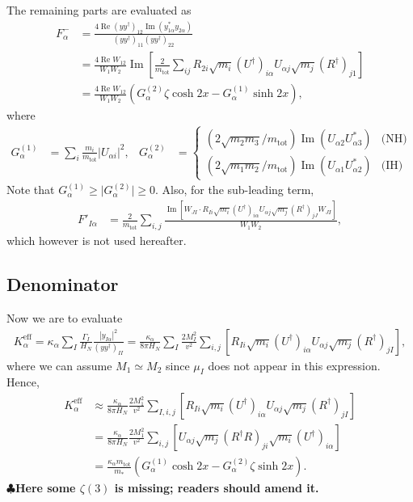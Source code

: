 \documentclass[a4paper,11pt,captions=tableheading,DIV=12]{scrartcl}
\numberwithin{equation}{section}
\newcommand\abs[1]{\lvert#1\rvert}
\newcommand\Abs[1]{\left\lvert#1\right\rvert}
\newcommand{\TODO}[1]{{\textbf{\color{red}$\clubsuit$#1}}}
\renewcommand{\Re}{\mathop{\mathrm{Re}}}
\renewcommand{\Im}{\mathop{\mathrm{Im}}}
\newcommand\mtot{m_{\mathrm{tot}}}
\newcommand\yydag{(yy^\dagger)}
\begin{document}
The remaining parts are evaluated as
\begin{align}
 F^-_\alpha
&=
\frac{4\Re\yydag_{12}\Im(y_{1\alpha}^*y_{2\alpha})}{\yydag_{11}\yydag_{22}}
\\&=
\frac{4 \Re W_{12}}{W_1 W_2}\Im\left[
  \frac{2}{\mtot}
  \sum_{ij}
  R_{2i}\sqrt{m_i}(U^\dagger)_{i\alpha} U_{\alpha j}\sqrt{m_j}(R^\dagger)_{j1}
  \right]
\\&=
\frac{4 \Re W_{12}}{W_1 W_2}\left(G_\alpha^{(2)}\zeta\cosh2x - G_\alpha^{(1)}\sinh2x\right),
\end{align}
where
\begin{align}
  G^{(1)}_\alpha
&= \sum_i \frac{m_i}{\mtot}\Abs{U_{\alpha i}}^2,
&
  G^{(2)}_\alpha
&=
\begin{cases}
\left({2\sqrt{m_2m_3}}/{\mtot}\right)\Im\left(U_{\alpha2}U^*_{\alpha3}\right) & \text{(NH)}\\
\left({2\sqrt{m_1m_2}}/{\mtot}\right)\Im\left(U_{\alpha1}U^*_{\alpha2}\right) & \text{(IH)}
\end{cases}
\end{align}
Note that $G_\alpha^{(1)}\ge \abs{G_\alpha^{(2)}} \ge 0$.
Also, for the sub-leading term,
\begin{align}
 F'_{I\alpha}
&=
\frac{2}{\mtot}\sum_{i,j}
\frac{\Im\left[W_{JI}\cdot
R_{Ii}\sqrt{m_i}(U^\dagger)_{i\alpha}U_{\alpha j}\sqrt{m_j}(R^\dagger)_{jJ}
 W_{JI}\right]}
{W_1 W_2},
\end{align}
which however is not used hereafter.

\subsection{Denominator}
Now we are to evaluate
\begin{align}
 K_\alpha^{\mathrm{eff}}
= \kappa_\alpha \sum_I \frac{\Gamma_I}{H_N}\frac{|y_{I\alpha}|^2}{(yy^\dagger)_{II}}
=
\frac{\kappa_\alpha}{8\pi H_N} \sum_I \frac{2M_I^2}{v^2}\sum_{i,j}\left[
R_{Ii}\sqrt{m_i}(U^\dagger)_{i\alpha}U_{\alpha j}\sqrt{m_j}(R^\dagger)_{jI}
\right],
\end{align}
where we can assume $M_1\simeq M_2$ since $\mu_I$ does not appear in this expression.
Hence,
\begin{align}
 K_\alpha^{\mathrm{eff}}
&\approx
\frac{\kappa_\alpha}{8\pi H_N} \frac{2M_1^2}{v^2}\sum_{I,i,j}\left[
R_{Ii}\sqrt{m_i}(U^\dagger)_{i\alpha}U_{\alpha j}\sqrt{m_j}(R^\dagger)_{jI}
\right]\\
&=
\frac{\kappa_\alpha}{8\pi H_N} \frac{2M_1^2}{v^2}\sum_{i,j}\left[
U_{\alpha j}\sqrt{m_j}(R^\dagger R)_{ji}\sqrt{m_i}(U^\dagger)_{i\alpha}
\right]
\\&=
\frac{\kappa_\alpha \mtot}{m_*}
\left(
G_\alpha^{(1)}\cosh2x - G_\alpha^{(2)}\zeta\sinh2x
\right).
\end{align}
\TODO{Here some $\zeta(3)$ is missing; readers should amend it.}
\end{document}

